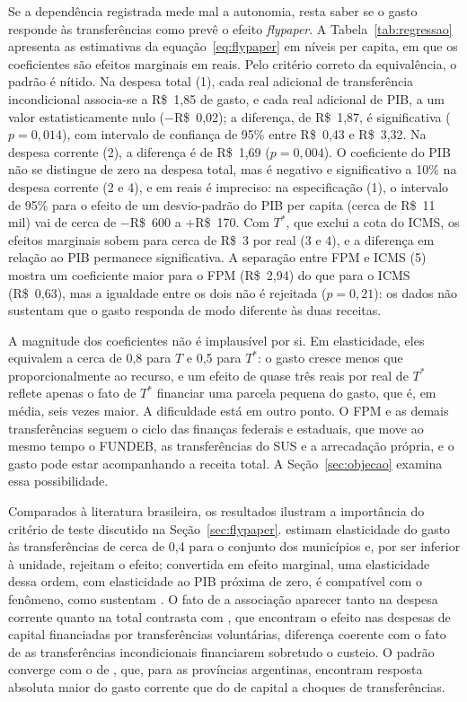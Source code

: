 Se a dependência registrada mede mal a autonomia, resta saber se o gasto responde às transferências como prevê o efeito \textit{flypaper}. A Tabela~\ref{tab:regressao} apresenta as estimativas da equação~\eqref{eq:flypaper} em níveis per capita, em que os coeficientes são efeitos marginais em reais. Pelo critério correto da equivalência, o padrão é nítido. Na despesa total (1), cada real adicional de transferência incondicional associa-se a R\$~1,85 de gasto, e cada real adicional de PIB, a um valor estatisticamente nulo ($-$R\$~0,02); a diferença, de R\$~1,87, é significativa ($p = 0{,}014$), com intervalo de confiança de 95\% entre R\$~0,43 e R\$~3,32. Na despesa corrente (2), a diferença é de R\$~1,69 ($p = 0{,}004$). O coeficiente do PIB não se distingue de zero na despesa total, mas é negativo e significativo a 10\% na despesa corrente (2 e 4), e em reais é impreciso: na especificação (1), o intervalo de 95\% para o efeito de um desvio-padrão do PIB per capita (cerca de R\$~11 mil) vai de cerca de $-$R\$~600 a $+$R\$~170. Com $T^{*}$, que exclui a cota do ICMS, os efeitos marginais sobem para cerca de R\$~3 por real (3 e 4), e a diferença em relação ao PIB permanece significativa. A separação entre FPM e ICMS (5) mostra um coeficiente maior para o FPM (R\$~2,94) do que para o ICMS (R\$~0,63), mas a igualdade entre os dois não é rejeitada ($p = 0{,}21$): os dados não sustentam que o gasto responda de modo diferente às duas receitas.



A magnitude dos coeficientes não é implausível por si. Em elasticidade, eles equivalem a cerca de 0,8 para $T$ e 0,5 para $T^{*}$: o gasto cresce menos que proporcionalmente ao recurso, e um efeito de quase três reais por real de $T^{*}$ reflete apenas o fato de $T^{*}$ financiar uma parcela pequena do gasto, que é, em média, seis vezes maior. A dificuldade está em outro ponto. O FPM e as demais transferências seguem o ciclo das finanças federais e estaduais, que move ao mesmo tempo o FUNDEB, as transferências do SUS e a arrecadação própria, e o gasto pode estar acompanhando a receita total. A Seção~\ref{sec:objecao} examina essa possibilidade.

Comparados à literatura brasileira, os resultados ilustram a importância do critério de teste discutido na Seção~\ref{sec:flypaper}. \citet{Paz2020} estimam elasticidade do gasto às transferências de cerca de 0,4 para o conjunto dos municípios e, por ser inferior à unidade, rejeitam o efeito; convertida em efeito marginal, uma elasticidade dessa ordem, com elasticidade ao PIB próxima de zero, é compatível com o fenômeno, como sustentam \citet{Pansani2020}. O fato de a associação aparecer tanto na despesa corrente quanto na total contrasta com \citet{Luz2022}, que encontram o efeito nas despesas de capital financiadas por transferências voluntárias, diferença coerente com o fato de as transferências incondicionais financiarem sobretudo o custeio. O padrão converge com o de \citet{Porto2026}, que, para as províncias argentinas, encontram resposta absoluta maior do gasto corrente que do de capital a choques de transferências.

